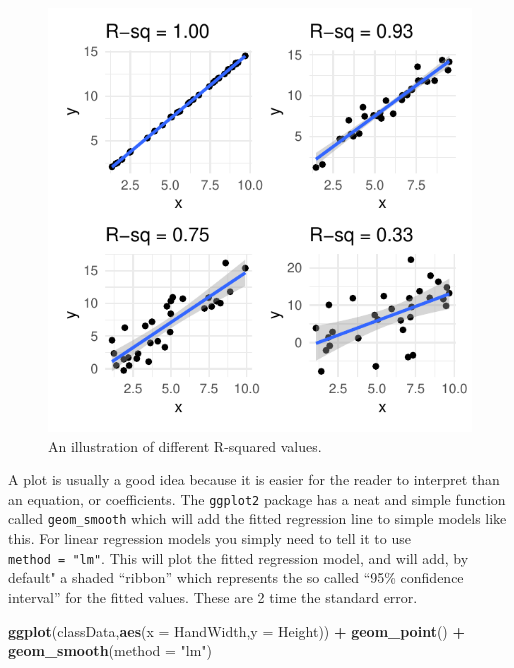 \documentclass[
  a4paperpaper,
]{book}
\newenvironment{Shaded}{\begin{snugshade}}{\end{snugshade}}
\newcommand{\DataTypeTok}[1]{\textcolor[rgb]{0.13,0.29,0.53}{#1}}
\newcommand{\KeywordTok}[1]{\textcolor[rgb]{0.13,0.29,0.53}{\textbf{#1}}}
\newcommand{\NormalTok}[1]{#1}
\newcommand{\OperatorTok}[1]{\textcolor[rgb]{0.81,0.36,0.00}{\textbf{#1}}}
\newcommand{\StringTok}[1]{\textcolor[rgb]{0.31,0.60,0.02}{#1}}
\begin{document}
\begin{figure}[ht]

{\centering \includegraphics{BB852_files/figure-latex/rSquared-1} 

}

\caption{An illustration of different R-squared values.}\label{fig:rSquared}
\end{figure}

A plot is usually a good idea because it is easier for the reader to interpret than an equation, or coefficients. The \texttt{ggplot2} package has a neat and simple function called \texttt{geom\_smooth} which will add the fitted regression line to simple models like this. For linear regression models you simply need to tell it to use \texttt{method\ =\ "lm"}. This will plot the fitted regression model, and will add, by default" a shaded ``ribbon'' which represents the so called ``95\% confidence interval'' for the fitted values. These are 2 time the standard error.

\begin{Shaded}
\begin{Highlighting}[]
\KeywordTok{ggplot}\NormalTok{(classData,}\KeywordTok{aes}\NormalTok{(}\DataTypeTok{x =}\NormalTok{ HandWidth,}\DataTypeTok{y =}\NormalTok{ Height)) }\OperatorTok{+}
\StringTok{  }\KeywordTok{geom\_point}\NormalTok{() }\OperatorTok{+}\StringTok{ }
\StringTok{  }\KeywordTok{geom\_smooth}\NormalTok{(}\DataTypeTok{method =} \StringTok{"lm"}\NormalTok{)}
\end{Highlighting}
\end{Shaded}
\end{document}
